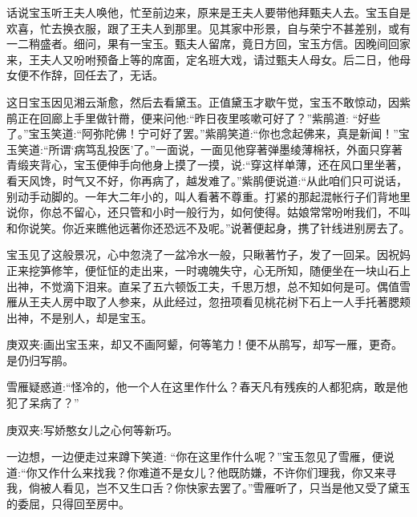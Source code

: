 

\begin{parag}
    话说宝玉听王夫人唤他，忙至前边来，原来是王夫人要带他拜甄夫人去。宝玉自是欢喜，忙去换衣服，跟了王夫人到那里。见其家中形景，自与荣宁不甚差别，或有一二稍盛者。细问，果有一宝玉。甄夫人留席，竟日方回，宝玉方信。因晚间回家来，王夫人又吩咐预备上等的席面，定名班大戏，请过甄夫人母女。后二日，他母女便不作辞，回任去了，无话。
\end{parag}


\begin{parag}
    这日宝玉因见湘云渐愈，然后去看黛玉。正值黛玉才歇午觉，宝玉不敢惊动，因紫鹃正在回廊上手里做针黹，便来问他:“昨日夜里咳嗽可好了？”紫鹃道: “好些了。”宝玉笑道:“阿弥陀佛！宁可好了罢。”紫鹃笑道:“你也念起佛来，真是新闻！”宝玉笑道:“所谓‘病笃乱投医’了。”一面说，一面见他穿著弹墨绫薄棉袄，外面只穿著青缎夹背心，宝玉便伸手向他身上摸了一摸，说:“穿这样单薄，还在风口里坐著，看天风馋，时气又不好，你再病了，越发难了。”紫鹃便说道:“从此咱们只可说话，别动手动脚的。一年大二年小的，叫人看著不尊重。打紧的那起混帐行子们背地里说你，你总不留心，还只管和小时一般行为，如何使得。姑娘常常吩咐我们，不叫和你说笑。你近来瞧他远著你还恐远不及呢。”说著便起身，携了针线进别房去了。
\end{parag}


\begin{parag}
    宝玉见了这般景况，心中忽浇了一盆冷水一般，只瞅著竹子，发了一回呆。因祝妈正来挖笋修竿，便怔怔的走出来，一时魂魄失守，心无所知，随便坐在一块山石上出神，不觉滴下泪来。直呆了五六顿饭工夫，千思万想，总不知如何是可。偶值雪雁从王夫人房中取了人参来，从此经过，忽扭项看见桃花树下石上一人手托著腮颊出神，不是别人，却是宝玉。\begin{note}庚双夹:画出宝玉来，却又不画阿颦，何等笔力！便不从鹃写，却写一雁，更奇。是仍归写鹃。\end{note}雪雁疑惑道:“怪冷的，他一个人在这里作什么？春天凡有残疾的人都犯病，敢是他犯了呆病了？”\begin{note}庚双夹:写娇憨女儿之心何等新巧。\end{note}一边想，一边便走过来蹲下笑道: “你在这里作什么呢？”宝玉忽见了雪雁，便说道:“你又作什么来找我？你难道不是女儿？他既防嫌，不许你们理我，你又来寻我，倘被人看见，岂不又生口舌？你快家去罢了。”雪雁听了，只当是他又受了黛玉的委屈，只得回至房中。
\end{parag}


